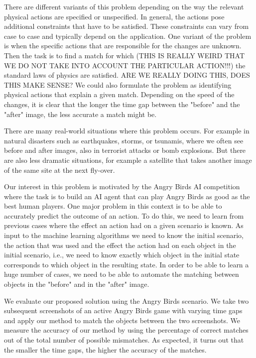 \documentclass[letterpaper]{article}
\begin{document}
There are different variants of this problem depending on the way the relevant physical actions are specified or unspecified. In general, the actions pose additional constraints that have to be satisfied. These constraints can vary from case to case and typically depend on the application. One variant of the problem is when the specific actions that are responsible for the changes are unknown. Then the task is to find a match for which (THIS IS REALLY WEIRD THAT WE DO NOT TAKE INTO ACCOUNT THE PARTICULAR ACTION!!!) the standard laws of physics are satisfied. ARE WE REALLY DOING THIS, DOES THIS MAKE SENSE?
We could also formulate the problem as identifying physical actions that explain a given match.
Depending on the speed of the changes, it is clear that the longer the time gap between the "before" and the "after" image, the less accurate a match might be.

There are many real-world situations where this problem occurs. For example in natural disasters such as earthquakes, storms, or tsunamis, where we often see before and after images, also in terrorist attacks or bomb explosions. But there are also less dramatic situations, for example a satellite that takes another image of the same site at the next fly-over.

Our interest in this problem is motivated by the Angry Birds AI competition where the task is to build an AI agent that can play Angry Birds as good as the best human players. One major problem in this context is to be able to accurately predict the outcome of an action. To do this, we need to learn from previous cases where the effect an action had on a given scenario is known. As input to the machine learning algorithms we need to know the initial scenario, the action that was used and the effect the action had on each object in the initial scenario, i.e., we need to know exactly which object in the initial state corresponds to which object in the resulting state. In order to be able to learn a huge number of cases, we need to be able to automate the matching between objects in the "before" and in the "after" image.

We evaluate our proposed solution using the Angry Birds scenario. We take two subsequent screenshots of an active Angry Birds game with varying time gaps and apply our method to match the objects between the two screenshots. We measure the accuracy of our method by using the percentage of correct matches out of the total number of possible mismatches. As expected, it turns out that the smaller the time gaps, the higher the accuracy of the matches.
\end{document}
